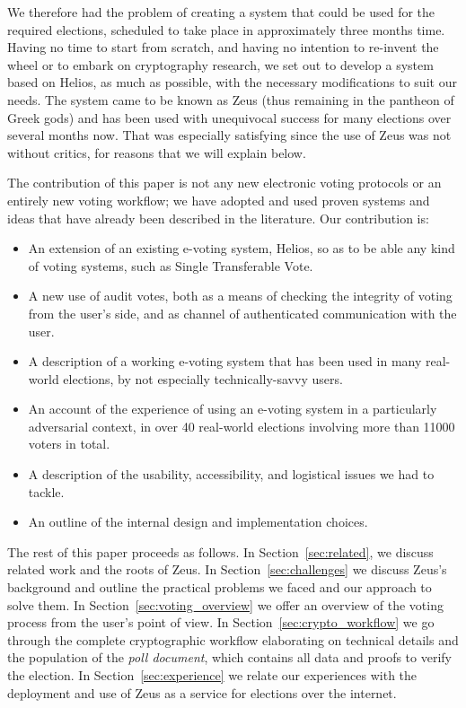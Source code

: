 \documentclass[letterpaper,10pt]{article}
\begin{document}
We therefore had the problem of creating a system that could be used
for the required elections, scheduled to take place in approximately
three months time. Having no time to start from scratch, and having
no intention to re-invent the wheel or to embark on cryptography
research, we set out to develop a system based on Helios, as much as
possible, with the necessary modifications to suit our needs. The
system came to be known as Zeus (thus remaining in the pantheon of
Greek gods) and has been used with unequivocal success for many
elections over several months now. That was especially satisfying
since the use of Zeus was not without critics, for reasons that we
will explain below.

The contribution of this paper is not any new electronic voting
protocols or an entirely new voting workflow; we have adopted and used
proven systems and ideas that have already been described in the
literature. Our contribution is:
\begin{itemize}
\item An extension of an existing e-voting system, Helios, so as to be
  able any kind of voting systems, such as Single Transferable Vote.
\item A new use of audit votes, both as a means of checking the
  integrity of voting from the user's side, and as channel of
  authenticated communication with the user.
\item A description of a working e-voting system that has been used in
  many real-world elections, by not especially technically-savvy
  users.
\item An account of the experience of using an e-voting system in a
  particularly adversarial context, in over 40 real-world elections
  involving more than 11000 voters in total.
\item A description of the usability, accessibility, and logistical
  issues we had to tackle.
\item An outline of the internal design and implementation choices.
\end{itemize}

The rest of this paper proceeds as follows. 
In Section~\ref{sec:related},
we discuss related work and the roots of Zeus.
In Section~\ref{sec:challenges} we discuss Zeus's background and outline
the practical problems we faced and our approach to solve them.
In Section~\ref{sec:voting_overview} we offer an overview of the voting
process from the user's point of view.
In Section~\ref{sec:crypto_workflow} we go through the complete
cryptographic workflow elaborating on technical details and the
population of the \emph{poll document}, which contains all data
and proofs to verify the election.
In Section~\ref{sec:experience} we relate our experiences with the
deployment and use of Zeus as a service for elections over the internet.
\end{document}
